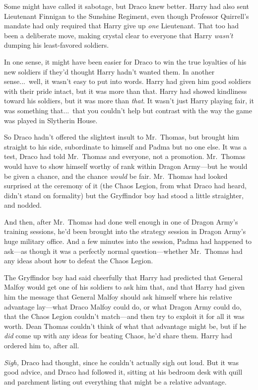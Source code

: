 Some might have called it sabotage, but Draco knew better. Harry
had also sent Lieutenant Finnigan to the Sunshine Regiment, even
though Professor Quirrell’s mandate had only required that Harry
give up \emph{one} Lieutenant. That too had been a deliberate move,
making crystal clear to everyone that Harry \emph{wasn’t} dumping
his least-favored soldiers.

In one sense, it might have been easier for Draco to win the
true loyalties of his new soldiers if they’d thought Harry hadn’t
wanted them. In another sense...\ well, it wasn’t easy to put into
words. Harry had given him good soldiers with their pride intact,
but it was more than that. Harry had showed kindliness toward his
soldiers, but it was more than \emph{that}. It wasn’t just Harry
playing fair, it was something that...\ that you couldn’t help but
contrast with the way the game was played in Slytherin House.

So Draco hadn’t offered the slightest insult to Mr.~Thomas, but
brought him straight to his side, subordinate to himself and Padma
but no one else. It was a test, Draco had told Mr.~Thomas and
everyone, not a promotion. Mr.~Thomas would have to show himself
worthy of rank within Dragon Army—but he would be given a chance,
and the chance \emph{would} be fair. Mr.~Thomas had looked
surprised at the ceremony of it (the Chaos Legion, from what Draco
had heard, didn’t stand on formality) but the Gryffindor boy had
stood a little straighter, and nodded.

And then, after Mr.~Thomas had done well enough in one of Dragon
Army’s training sessions, he’d been brought into the strategy
session in Dragon Army’s huge military office. And a few minutes
into the session, Padma had happened to ask—as though it was a
perfectly normal question—whether Mr.~Thomas had any ideas about
how to defeat the Chaos Legion.

The Gryffindor boy had said cheerfully that Harry had predicted
that General Malfoy would get one of his soldiers to ask him that,
and that Harry had given him the message that General Malfoy should
ask himself where his relative advantage lay—what Draco Malfoy
could do, or what Dragon Army could do, that the Chaos Legion
couldn’t match—and then try to exploit it for all it was worth.
Dean Thomas couldn’t think of what that advantage might be, but if
he \emph{did} come up with any ideas for beating Chaos, he’d share
them. Harry had ordered him to, after all.

\emph{Sigh,} Draco had thought, since he couldn’t actually sigh
out loud. But it was good advice, and Draco had followed it,
sitting at his bedroom desk with quill and parchment listing out
everything that might be a relative advantage.

